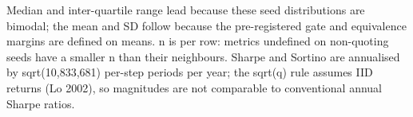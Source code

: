 \begin{table}[htbp]
\begin{tabular}{lrrrrrrr}
    \bottomrule
  \end{tabular}
  \begin{minipage}{\linewidth}\vspace{4pt}\footnotesize Median and inter-quartile range lead because these seed distributions are bimodal; the mean and SD follow because the pre-registered gate and equivalence margins are defined on means. n is per row: metrics undefined on non-quoting seeds have a smaller n than their neighbours. Sharpe and Sortino are annualised by sqrt(10,833,681) per-step periods per year; the sqrt(q) rule assumes IID returns (Lo 2002), so magnitudes are not comparable to conventional annual Sharpe ratios.\end{minipage}
\end{table}
